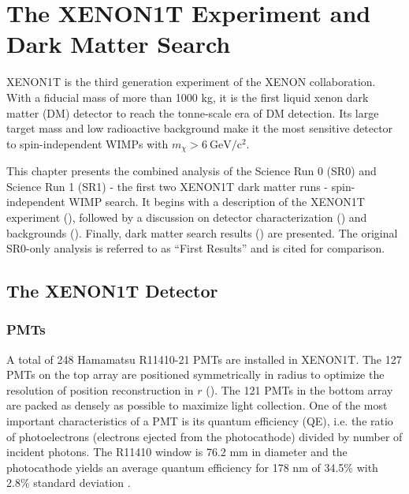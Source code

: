 

\pagestyle{cu}
\graphicspath{{./Chapter3/Figures/}}
\chapter[The XENON1T Experiment and Dark Matter Search][The XENON1T Experiment and Dark Matter Search]{The XENON1T Experiment and Dark Matter Search}
\label{chap:xenon1t}



XENON1T is the third generation experiment of the XENON collaboration.  With a fiducial mass of more than 1000 kg, it is the first
liquid xenon dark matter (DM) detector to reach the tonne-scale era of DM detection.  Its large target mass and low radioactive background
make it the most sensitive detector to spin-independent WIMPs with $m_{\chi} > 6\ \mathrm{GeV / c^2}$.

This chapter presents the combined analysis of the Science Run 0 (SR0) and Science Run 1 (SR1) - the first two XENON1T dark matter
runs - spin-independent WIMP search.  It begins with a description of the XENON1T experiment (), followed by
a discussion on detector characterization () and backgrounds
().  Finally, dark matter search results () are
presented.  The original SR0-only analysis  is referred to as ``First Results'' and is cited for comparison.

\section{The XENON1T Detector}
\label{sec:xenon1t_detector}




\subsection{PMTs}
\label{subsec:xenon1t_pmts}
A total of 248 Hamamatsu R11410-21 PMTs are installed in XENON1T.  The 127 PMTs on the top array are positioned symmetrically in radius to
optimize the resolution of position reconstruction in $r$ ().  The 121 PMTs in the bottom
array are packed as densely as possible to maximize light collection.  One of the most important characteristics of a PMT is its quantum
efficiency
(QE), i.e. the ratio of photoelectrons (electrons ejected from the photocathode) divided by number of incident photons.  The R11410 window
is 76.2 mm in diameter and the photocathode yields an average quantum efficiency for 178 nm of 34.5\% with 2.8\%
standard deviation .

